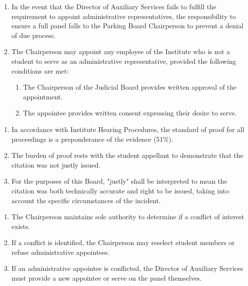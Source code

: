 \begin{enumerate}
    \item In the event that the Director of Auxiliary Services fails to fulfill the requirement to appoint administrative representatives, the responsibility to ensure a full panel falls to the Parking Board Chairperson to prevent a denial of due process.
    \item The Chairperson may appoint any employee of the Institute who is not a student to serve as an administrative representative, provided the following conditions are met:
    \begin{enumerate}
        \item The Chairperson of the Judicial Board provides written approval of the appointment.
        \item The appointee provides written consent expressing their desire to serve.
    \end{enumerate}
\end{enumerate}

\begin{enumerate}
    \item In accordance with Institute Hearing Procedures, the standard of proof for all proceedings is a preponderance of the evidence (51\%).
    \item The burden of proof rests with the student appellant to demonstrate that the citation was not justly issued.
    \item For the purposes of this Board, "justly" shall be interpreted to mean the citation was both technically accurate and right to be issued, taking into account the specific circumstances of the incident.
\end{enumerate}

\begin{enumerate}
    \item The Chairperson maintains sole authority to determine if a conflict of interest exists.
    \item If a conflict is identified, the Chairperson may reselect student members or refuse administrative appointees.
    \item If an administrative appointee is conflicted, the Director of Auxiliary Services must provide a new appointee or serve on the panel themselves.
\end{enumerate}

